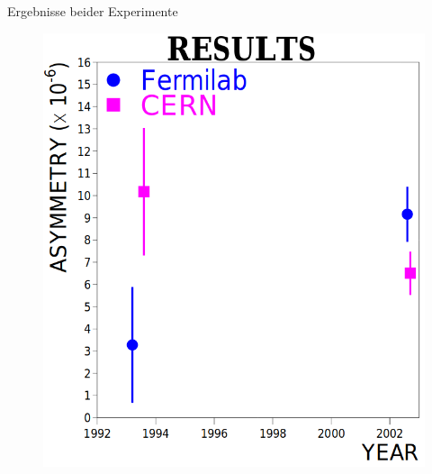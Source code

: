 \documentclass[aspectratio=1610, professionalfonts, 9pt, t]{beamer}
\begin{document}
  \begin{frame}{Ergebnisse beider Experimente}
    \begin{figure}
      \includegraphics[height=0.8\textheight]{Images/resultsreee.png}
    \end{figure}
  \end{frame}


\end{document}

